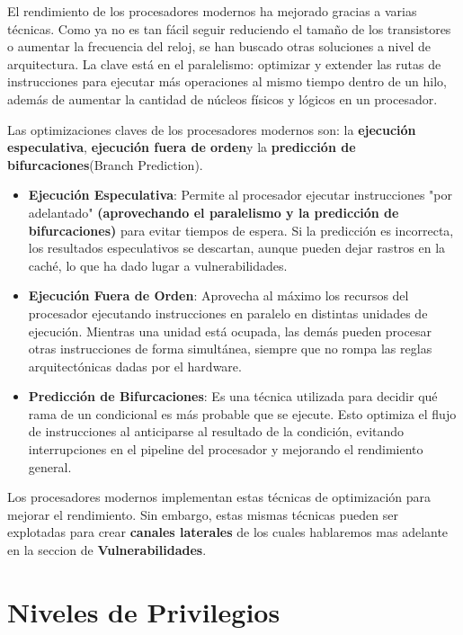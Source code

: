 \documentclass[lettersize,compsoc]{IEEEtran}
\begin{document}
El rendimiento de los procesadores modernos ha mejorado gracias a varias técnicas. Como ya no es tan fácil seguir reduciendo el tamaño de los transistores o aumentar la frecuencia del reloj, se han buscado otras soluciones a nivel de arquitectura. La clave está en el paralelismo: optimizar y extender las rutas de instrucciones para ejecutar más operaciones al mismo tiempo dentro de un hilo, además de aumentar la cantidad de núcleos físicos y lógicos en un procesador.

Las optimizaciones claves de los procesadores modernos son: la \textbf{ejecución especulativa}, \textbf{ejecución fuera de orden}y la \textbf{predicción de bifurcaciones}(Branch Prediction). 
\begin{itemize}
  \item \textbf{Ejecución Especulativa}: Permite al procesador ejecutar instrucciones "por adelantado" \textbf{(aprovechando el paralelismo y la predicción de bifurcaciones)\cite{ref}} para evitar tiempos de espera. Si la predicción es incorrecta, los resultados especulativos se descartan, aunque pueden dejar rastros en la caché, lo que ha dado lugar a vulnerabilidades.
  \item \textbf{Ejecución Fuera de Orden}: Aprovecha al máximo los recursos del procesador ejecutando instrucciones en paralelo en distintas unidades de ejecución. Mientras una unidad está ocupada, las demás pueden procesar otras instrucciones de forma simultánea, siempre que no rompa las reglas arquitectónicas dadas por el hardware.
  \item \textbf{Predicción de Bifurcaciones}: Es una técnica utilizada para decidir qué rama de un condicional es más probable que se ejecute. Esto optimiza el flujo de instrucciones al anticiparse al resultado de la condición, evitando interrupciones en el pipeline del procesador y mejorando el rendimiento general.
  \end{itemize}
  

Los procesadores modernos implementan estas técnicas de optimización para mejorar el rendimiento. Sin embargo, estas mismas técnicas pueden ser explotadas para crear \textbf{canales laterales} de los cuales hablaremos mas adelante en la seccion de \textbf{Vulnerabilidades}. 


\section{Niveles de Privilegios}
\end{document}
